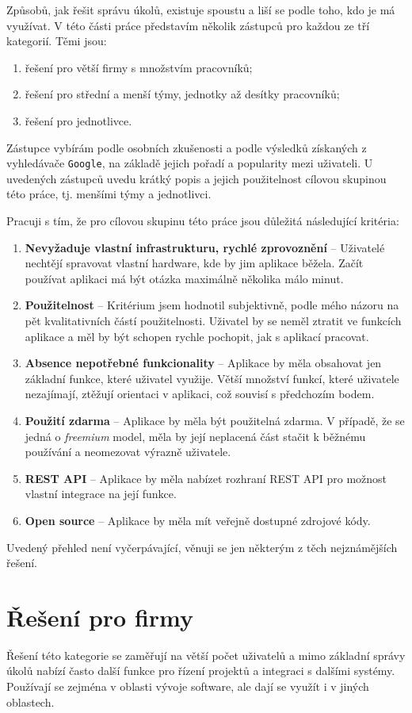 \documentclass[thesis=B,czech]{FITthesis}[2012/06/26]
\newcommand{\crita}{Nevyžaduje vlastní infrastrukturu, rychlé zprovoznění}
\newcommand{\critb}{Použitelnost}
\newcommand{\critc}{Absence nepotřebné funkcionality}
\newcommand{\critd}{Použití zdarma}
\newcommand{\critf}{REST API}
\newcommand{\critg}{Open source}
\begin{document}
	Způsobů, jak řešit správu úkolů, existuje spoustu a liší se podle toho, kdo je má využívat. V této části práce představím několik zástupců pro každou ze tří kategorií. Těmi jsou:
	\begin{enumerate}
	  \item řešení pro větší firmy s množstvím pracovníků;
	  \item řešení pro střední a menší týmy, jednotky až desítky pracovníků;
	  \item řešení pro jednotlivce.
	\end{enumerate}

	Zástupce vybírám podle osobních zkušenosti a podle výsledků získaných z vyhledávače \texttt{Google}, na základě jejich pořadí a popularity mezi uživateli. U uvedených zástupců uvedu krátký popis a jejich použitelnost cílovou skupinou této práce, tj. menšími týmy a jednotlivci.

	Pracuji s tím, že pro cílovou skupinu této práce jsou důležitá následující kritéria:
	\begin{enumerate}
		\item \textbf{\crita} -- Uživatelé nechtějí spravovat vlastní hardware, kde by jim aplikace běžela. Začít používat aplikaci má být otázka maximálně několika málo minut.
		\item \textbf{\critb} -- Kritérium jsem hodnotil subjektivně, podle mého názoru na pět kvalitativních částí použitelnosti\cite{usability}. Uživatel by se neměl ztratit ve funkcích aplikace a měl by být schopen rychle pochopit, jak s aplikací pracovat. 
		\item \textbf{\critc} -- 	Aplikace by měla obsahovat jen základní funkce, které uživatel využije. Větší množství funkcí, které uživatele nezajímají, ztěžují orientaci v aplikaci, což souvisí s předchozím bodem.
		\item \textbf{\critd} -- Aplikace by měla být použitelná zdarma. V případě, že se jedná o \textit{freemium} model, měla by její neplacená část stačit k běžnému používání a neomezovat výrazně uživatele.
		\item \textbf{\critf} -- Aplikace by měla nabízet rozhraní REST API pro možnost vlastní integrace na její funkce.
		\item \textbf{\critg} -- Aplikace by měla mít veřejně dostupné zdrojové kódy.
	\end{enumerate}
	Uvedený přehled není vyčerpávající, věnuji se jen některým z těch nejznámějších řešení. 

	\section{Řešení pro firmy}
		\label{sec:solutions-companies}
		Řešení této kategorie se zaměřují na větší počet uživatelů a mimo základní správy úkolů nabízí často další funkce pro řízení projektů a integraci s dalšími systémy. Používají se zejména v oblasti vývoje software, ale dají se využít i v jiných oblastech.
		
\end{document}
